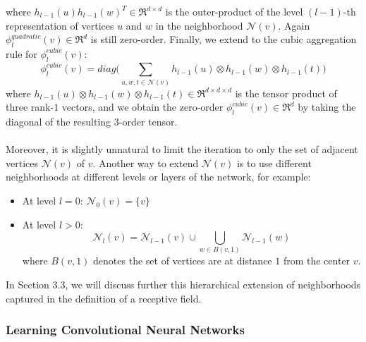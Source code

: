 \documentclass[a4paper]{article}
\begin{document}
where $h_{l - 1}(u) h_{l - 1}(w)^T \in \Re^{d \times d}$ is the outer-product of the level $(l - 1)$-th representation of vertices $u$ and $w$ in the neighborhood $\mathcal{N}(v)$. Again $\phi_l^{quadratic}(v) \in \Re^d$ is still zero-order. Finally, we extend to the cubic aggregation rule for $\phi_l^{cubic}(v)$:
$$\phi_l^{cubic}(v) = diag \bigg( \sum\limits_{u, w, t \in \mathcal{N}(v)} h_{l - 1}(u) \otimes h_{l - 1}(w) \otimes h_{l - 1}(t) \bigg)$$
where $h_{l - 1}(u) \otimes h_{l - 1}(w) \otimes h_{l - 1}(t) \in \Re^{d \times d \times d}$ is the tensor product of three rank-$1$ vectors, and we obtain the zero-order $\phi_l^{cubic}(v) \in \Re^d$ by taking the diagonal of the resulting $3$-order tensor. \\ \\
Moreover, it is slightly unnatural to limit the iteration to only the set of adjacent vertices $\mathcal{N}(v)$  of $v$. Another way to extend $\mathcal{N}(v)$ is to use different neighborhoods at different levels or layers of the network, for example:
\begin{itemize}
	\item At level $l = 0$: $\mathcal{N}_0(v) = \{v\}$
	\item At level $l > 0$: 
	$$\mathcal{N}_l(v) = \mathcal{N}_{l - 1}(v) \cup \bigcup_{w \in B(v, 1)} \mathcal{N}_{l - 1}(w)$$
	where $B(v, 1)$ denotes the set of vertices are at distance $1$ from the center $v$.
\end{itemize}
In Section 3.3, we will discuss further this hierarchical extension of neighborhoods captured in the definition of a receptive field.

\subsubsection{Learning Convolutional Neural Networks \cite{Niepert}}
\end{document}
